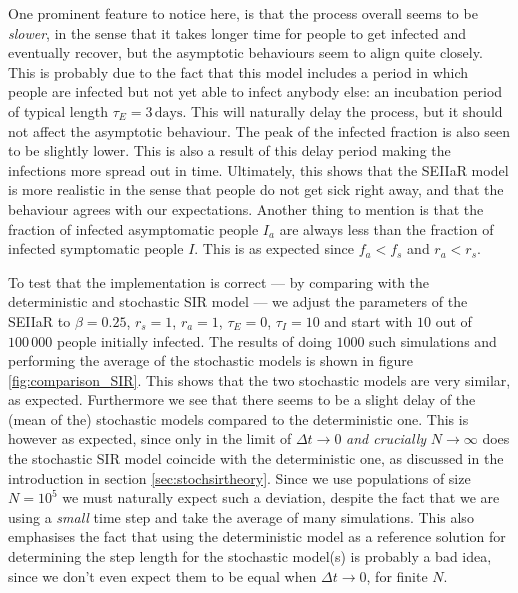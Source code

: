 One prominent feature to notice here, is that the process overall seems to be \textit{slower}, in the sense that it takes longer time for people to get infected and eventually recover, but the asymptotic behaviours seem to align quite closely. This is probably due to the fact that this model includes a period in which people are infected but not yet able to infect anybody else: an incubation period of typical length $\tau_E = 3 \, \mathrm{days}$. This will naturally delay the process, but it should not affect the asymptotic behaviour. The peak of the infected fraction is also seen to be slightly lower. This is also a result of this delay period making the infections more spread out in time. Ultimately, this shows that the SEIIaR model is more realistic in the sense that people do not get sick right away, and that the behaviour agrees with our expectations. Another thing to mention is that the fraction of infected asymptomatic people $I_a$ are always less than the fraction of infected symptomatic people $I$. This is as expected since $f_a < f_s$ and $r_a < r_s$.

To test that the implementation is correct --- by comparing with the deterministic and stochastic SIR model --- we adjust the parameters of the SEIIaR to $\beta = 0.25$, $r_s = 1$, $r_a = 1$, $\tau_E = 0$, $\tau_I= 10$ and start with $10$ out of $100 \, 000$ people initially infected. The results of doing $1000$ such simulations and performing the average of the stochastic models is shown in figure \ref{fig:comparison_SIR}. This shows that the two stochastic models are very similar, as expected. Furthermore we see that there seems to be a slight delay of the (mean of the) stochastic models compared to the deterministic one. This is however as expected, since only in the limit of $\Delta t\to 0$ \textit{and crucially} $N\to \infty$ does the stochastic SIR model coincide with the deterministic one, as discussed in the introduction in section \ref{sec:stochsirtheory}. Since we use populations of size $N = 10^5$ we must naturally expect such a deviation, despite the fact that we are using a \textit{small} time step and take the average of many simulations. This also emphasises the fact that using the deterministic model as a reference solution for determining the step length for the stochastic model(s) is probably a bad idea, since we don't even expect them to be equal when $\Delta t \to 0$, for finite $N$. 

